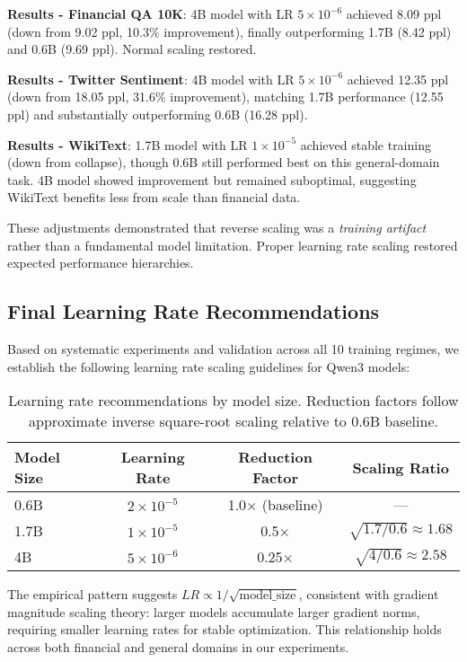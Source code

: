 \textbf{Results - Financial QA 10K}: 4B model with LR $5 \times 10^{-6}$ achieved 8.09 ppl (down from 9.02 ppl, 10.3\% improvement), finally outperforming 1.7B (8.42 ppl) and 0.6B (9.69 ppl). Normal scaling restored.

\textbf{Results - Twitter Sentiment}: 4B model with LR $5 \times 10^{-6}$ achieved 12.35 ppl (down from 18.05 ppl, 31.6\% improvement), matching 1.7B performance (12.55 ppl) and substantially outperforming 0.6B (16.28 ppl).

\textbf{Results - WikiText}: 1.7B model with LR $1 \times 10^{-5}$ achieved stable training (down from collapse), though 0.6B still performed best on this general-domain task. 4B model showed improvement but remained suboptimal, suggesting WikiText benefits less from scale than financial data.

These adjustments demonstrated that reverse scaling was a \textit{training artifact} rather than a fundamental model limitation. Proper learning rate scaling restored expected performance hierarchies.

\subsection{Final Learning Rate Recommendations}

Based on systematic experiments and validation across all 10 training regimes, we establish the following learning rate scaling guidelines for Qwen3 models:

\begin{table}[h]
\centering
\begin{tabular}{lccc}
\toprule
\textbf{Model Size} & \textbf{Learning Rate} & \textbf{Reduction Factor} & \textbf{Scaling Ratio} \\
\midrule
0.6B & $2 \times 10^{-5}$ & 1.0$\times$ (baseline) & --- \\
1.7B & $1 \times 10^{-5}$ & 0.5$\times$ & $\sqrt{1.7/0.6} \approx 1.68$ \\
4B & $5 \times 10^{-6}$ & 0.25$\times$ & $\sqrt{4/0.6} \approx 2.58$ \\
\bottomrule
\end{tabular}
\caption{Learning rate recommendations by model size. Reduction factors follow approximate inverse square-root scaling relative to 0.6B baseline.}
\end{table}

The empirical pattern suggests $LR \propto 1/\sqrt{\text{model\_size}}$, consistent with gradient magnitude scaling theory: larger models accumulate larger gradient norms, requiring smaller learning rates for stable optimization. This relationship holds across both financial and general domains in our experiments.

